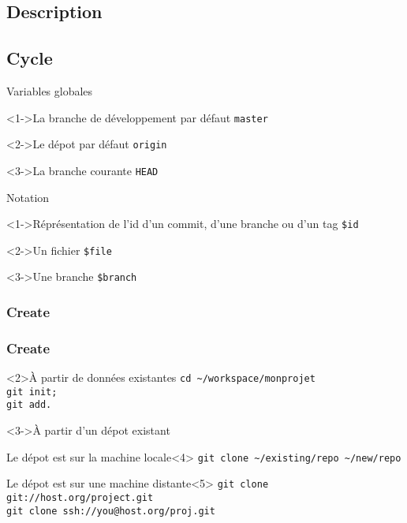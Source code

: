 \subsection{Description}
\subsection{Cycle}
	\begin{frame}[fragile]{Variables globales}
		\begin{block}<1->{La branche de développement par défaut}
			\verb'master'
		\end{block}
		\begin{block}<2->{Le dépot par défaut}
			\verb'origin'
		\end{block}
		\begin{block}<3->{La branche courante}
			\verb'HEAD'
		\end{block}
	\end{frame}
	
	\begin{frame}[fragile]{Notation}
		\begin{block}<1->{Réprésentation de l'id d'un commit, d'une branche ou d'un tag}
			\verb'$id'
		\end{block}
		\begin{block}<2->{Un fichier}
			\verb'$file'
		\end{block}
		\begin{block}<3->{Une branche}
			\verb'$branch'
		\end{block}
	\end{frame}

	\subsubsection{Create}
		\begin{frame}[fragile]
			\frametitle{Create}
			\begin{block}<2>{À partir de données existantes}
				\verb'cd ~/workspace/monprojet'\\
				\verb'git init;'\\
				\verb'git add.'
			\end{block}
			\begin{block}<3->{À partir d'un dépot existant}
				\begin{exampleblock}{Le dépot est sur la machine locale}<4>
					\verb'git clone ~/existing/repo ~/new/repo'\\
				\end{exampleblock}

				\begin{exampleblock}{Le dépot est sur une machine distante}<5>
					\verb'git clone git://host.org/project.git'\\
					\verb'git clone ssh://you@host.org/proj.git'
				\end{exampleblock}
			\end{block}

		\end{frame}
		
